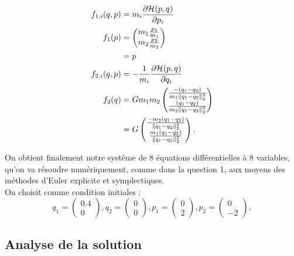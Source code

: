\begin{align*}
 f_{1,i}(q,p) &= m_i \fpart{\Ha(p,q)}{p_i} \\	
  f_1(p) & =
  \begin{pmatrix}
    m_1\frac{p_1}{m_1}\\
    m_2\frac{p_2}{m_2}
  \end{pmatrix}\\
  & = p\\
%	
 f_{2,i}(q,p) &= -\frac{1}{m_i}\fpart{\Ha(p,q)}{q_i} \\
  f_2(q) & = Gm_1m_2
  \begin{pmatrix}
    \frac{-(q_1-q_2)}{m_1\|q_1-q_2\|_2^3}\\
    \frac{(q_1-q_2)}{m_2\|q_1-q_2\|_2^3}
  \end{pmatrix}\\
  & = G
  \begin{pmatrix}
    \frac{-m_2 (q_1-q_2)}{\|q_1-q_2\|_2^3}\\
    \frac{m_1 (q_1-q_2)}{\|q_1-q_2\|_2^3}
  \end{pmatrix}.
\end{align*}

On obtient finalement notre système de 8 équations différentielles à 8 variables, qu'on va résoudre numériquement, comme dans la question 1, aux moyens des méthodes d'Euler explicite et symplectiques.\\
On choisit comme condition initiales : 
$$
q_1 = \begin{pmatrix}
0.4\\
0
\end{pmatrix},
q_2 = \begin{pmatrix}
0\\
0
\end{pmatrix},
p_1 = \begin{pmatrix}
0\\
2
\end{pmatrix},
p_2 = \begin{pmatrix}
0\\
-2
\end{pmatrix},
$$

\subsection{Analyse de la solution}

